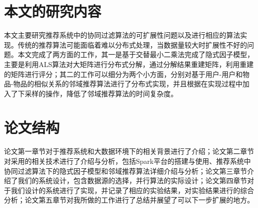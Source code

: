 \section{本文的研究内容}
本文主要研究推荐系统中的协同过滤算法的可扩展性问题以及进行相应的算法实现。传统的推荐算法可能面临着难以分布式处理，当数据量较大时扩展性不好的问题。本文完成了两方面的工作，其一是基于交替最小二乘法完成了隐式因子模型，主要是利用ALS算法对大矩阵进行分布式分解，通过分解结果重建矩阵，利用重建的矩阵进行评分；其二的工作可以细分为两个小方面，分别对基于用户-用户和物品-物品的相似关系的邻域推荐算法进行了分布式实现，并且根据在实现过程中加入了下采样的操作，降低了邻域推荐算法的时间复杂度。
\section{论文结构}
论文第一章节对于推荐系统和大数据环境下的相关背景进行了介绍；论文第二章节对采用的相关技术进行了介绍与分析，包括Spark平台的搭建与使用、推荐系统中协同过滤算法下的隐式因子模型和邻域推荐算法详细介绍与分析；论文第三章节介绍了我们的系统设计，包含数据源的选择，并行算法的实际设计；论文第四章节对于我们设计的系统进行了实现，并记录了相应的实验结果，对实验结果进行的综合分析；论文第五章节对我所做的工作进行了总结并展望了可以下一步扩展的地方。
